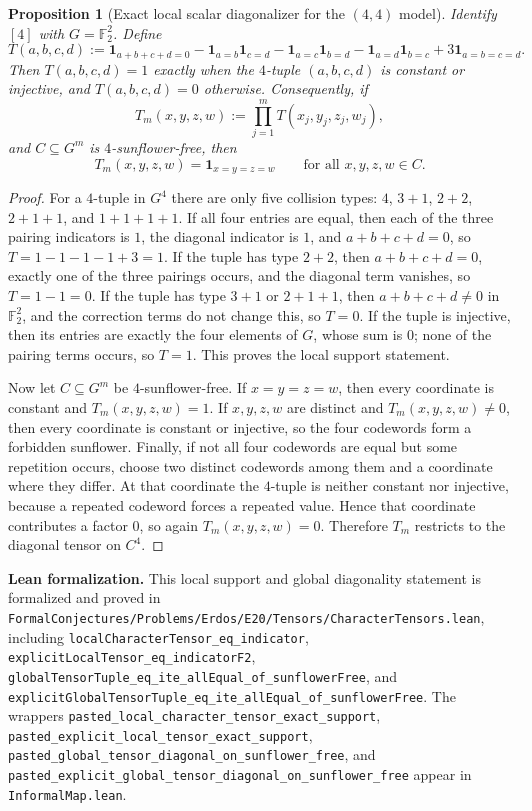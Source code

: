\documentclass[11pt]{article}
\newtheorem{proposition}[theorem]{Proposition}
\theoremstyle{definition}
\newcommand{\1}{\mathbf{1}}
\newcommand{\leannote}[1]{\par\smallskip\noindent\textbf{Lean formalization.} #1\par\smallskip}
\begin{document}
\begin{proposition}[Exact local scalar diagonalizer for the $(4,4)$ model]\label{prop:444-local-diagonalizer}
Identify $[4]$ with $G=\mathbb F_2^2$. Define
\[
T(a,b,c,d)
:=\mathbf 1_{a+b+c+d=0}
-\mathbf 1_{a=b}\mathbf 1_{c=d}
-\mathbf 1_{a=c}\mathbf 1_{b=d}
-\mathbf 1_{a=d}\mathbf 1_{b=c}
+3\mathbf 1_{a=b=c=d}.
\]
Then $T(a,b,c,d)=1$ exactly when the $4$-tuple $(a,b,c,d)$ is constant or injective, and $T(a,b,c,d)=0$ otherwise. Consequently, if
\[
T_m(x,y,z,w):=\prod_{j=1}^m T(x_j,y_j,z_j,w_j),
\]
and $C\subseteq G^m$ is $4$-sunflower-free, then
\[
T_m(x,y,z,w)=\mathbf 1_{x=y=z=w}
\qquad\text{for all }x,y,z,w\in C.
\]
\end{proposition}

\begin{proof}
For a $4$-tuple in $G^4$ there are only five collision types: $4$, $3+1$, $2+2$, $2+1+1$, and $1+1+1+1$. If all four entries are equal, then each of the three pairing indicators is $1$, the diagonal indicator is $1$, and $a+b+c+d=0$, so $T=1-1-1-1+3=1$. If the tuple has type $2+2$, then $a+b+c+d=0$, exactly one of the three pairings occurs, and the diagonal term vanishes, so $T=1-1=0$. If the tuple has type $3+1$ or $2+1+1$, then $a+b+c+d\neq 0$ in $\mathbb F_2^2$, and the correction terms do not change this, so $T=0$. If the tuple is injective, then its entries are exactly the four elements of $G$, whose sum is $0$; none of the pairing terms occurs, so $T=1$. This proves the local support statement.

Now let $C\subseteq G^m$ be $4$-sunflower-free. If $x=y=z=w$, then every coordinate is constant and $T_m(x,y,z,w)=1$. If $x,y,z,w$ are distinct and $T_m(x,y,z,w)\neq 0$, then every coordinate is constant or injective, so the four codewords form a forbidden sunflower. Finally, if not all four codewords are equal but some repetition occurs, choose two distinct codewords among them and a coordinate where they differ. At that coordinate the $4$-tuple is neither constant nor injective, because a repeated codeword forces a repeated value. Hence that coordinate contributes a factor $0$, so again $T_m(x,y,z,w)=0$. Therefore $T_m$ restricts to the diagonal tensor on $C^4$.
\end{proof}

\leannote{This local support and global diagonality statement is formalized and proved in \texttt{FormalConjectures/Problems/Erdos/E20/Tensors/CharacterTensors.lean}, including \texttt{localCharacterTensor\_eq\_indicator}, \texttt{explicitLocalTensor\_eq\_indicatorF2}, \texttt{globalTensorTuple\_eq\_ite\_allEqual\_of\_sunflowerFree}, and \texttt{explicitGlobalTensorTuple\_eq\_ite\_allEqual\_of\_sunflowerFree}. The wrappers \texttt{pasted\_local\_character\_tensor\_exact\_support}, \texttt{pasted\_explicit\_local\_tensor\_exact\_support}, \texttt{pasted\_global\_tensor\_diagonal\_on\_sunflower\_free}, and \texttt{pasted\_explicit\_global\_tensor\_diagonal\_on\_sunflower\_free} appear in \texttt{InformalMap.lean}.}
\end{document}
